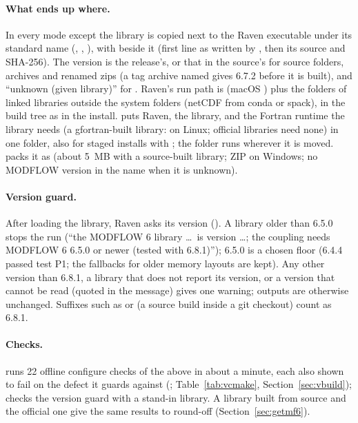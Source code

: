 \paragraph{What ends up where.} In every mode except  the library is copied next to the Raven executable under
its standard name (, , ), with  beside it
(first line  as written by , then its source and SHA-256). The version is the
release's, or that in the source's  for source folders, archives and renamed zips (a tag archive named
 gives 6.7.2 before it is built), and ``unknown (given library)'' for . Raven's run path is
 (macOS ) plus the folders of linked libraries outside the system folders (netCDF from
conda or spack), in the build tree as in the install.  puts Raven, the library,
 and the Fortran runtime the library needs (a gfortran-built library:  on
Linux; official libraries need none) in one  folder, also for staged installs with ; the folder
runs wherever it is moved.  packs it as  (about 5~MB with a
source-built library; ZIP on Windows; no MODFLOW version in the name when it is unknown).

\paragraph{Version guard.} After loading the library, Raven asks its version (). A library older
than 6.5.0 stops the run (``the MODFLOW 6 library \ldots\ is version \ldots; the coupling needs MODFLOW 6 6.5.0 or newer
(tested with 6.8.1)''); 6.5.0 is a chosen floor (6.4.4 passed test P1; the fallbacks for older memory layouts are
kept). Any other version than 6.8.1, a library that does not report its version, or a version that cannot be read
(quoted in the message) gives one warning; outputs are otherwise unchanged. Suffixes such as  or
 (a source build inside a git checkout) count as 6.8.1.

\paragraph{Checks.}  runs 22 offline configure checks of the above in about a minute, each
also shown to fail on the defect it guards against (; Table~\ref{tab:vcmake}, Section~\ref{sec:vbuild});
 checks the version guard with a stand-in library. A library built from source and the official one give the same results to
round-off (Section~\ref{sec:getmf6}).

